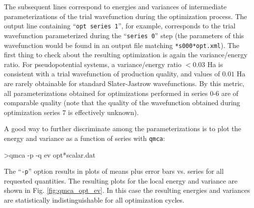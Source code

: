 The subsequent lines correspond to energies and variances of 
intermediate parameterizations of the trial wavefunction during 
the optimization process.  The output line containing 
``\texttt{opt  series 1}'', for example, corresponds to the trial 
wavefunction parameterized during the ``\texttt{series 0}'' step 
(the parameters of this wavefunction would be found in an output 
file matching \texttt{*s000*opt.xml}).  The first thing to check 
about the resulting optimization is again the variance/energy ratio. 
For pseudopotential systems, a variance/energy ratio $<0.03$ Ha is 
consistent with a trial wavefunction of production quality, and values 
of $0.01$ Ha are rarely obtainable for standard Slater-Jastrow 
wavefunctions.  By this metric, all parameterizations obtained for 
optimizations performed in series 0-6 are of comparable quality 
(note that the quality of the wavefunction obtained during optimization 
series 7 is effectively unknown).

A good way to further discriminate among the parameterizations is to 
plot the energy and variance as a function of series with \texttt{qmca}:
\begin{shade}
>qmca -p -q ev opt*scalar.dat
\end{shade}
\noindent
The ``\texttt{-p}'' option results in plots of means plus error bars 
vs. series for all requested quantities.
The resulting plots for the local energy and variance are shown 
in Fig. \ref{fig:qmca_opt_ev}.  In this case the resulting energies 
and variances are statistically indistinguishable for all optimization 
cycles.  

